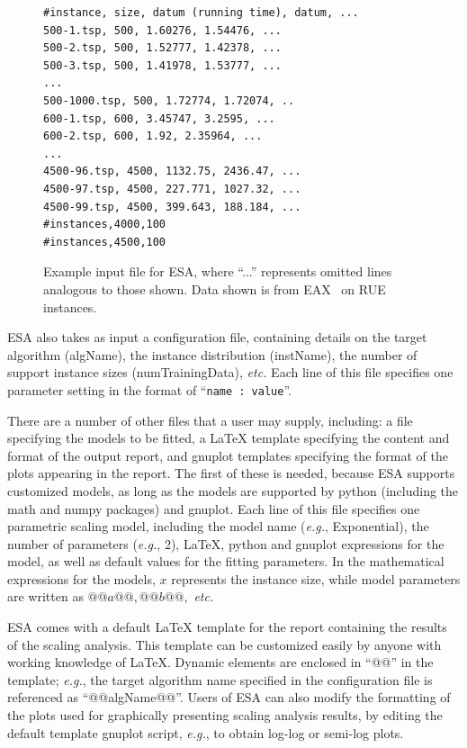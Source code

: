 \documentclass[aic]{iosart2x}
\newcommand{\eg}{\emph{e.g.}}
\begin{document}
\begin{figure}[t]
\begin{lstlisting}[basicstyle={\scriptsize\ttfamily}]
#instance, size, datum (running time), datum, ...
500-1.tsp, 500, 1.60276, 1.54476, ...
500-2.tsp, 500, 1.52777, 1.42378, ...
500-3.tsp, 500, 1.41978, 1.53777, ...
...
500-1000.tsp, 500, 1.72774, 1.72074, ..
600-1.tsp, 600, 3.45747, 3.2595, ...
600-2.tsp, 600, 1.92, 2.35964, ...
...
4500-96.tsp, 4500, 1132.75, 2436.47, ...
4500-97.tsp, 4500, 227.771, 1027.32, ...
4500-99.tsp, 4500, 399.643, 188.184, ...
#instances,4000,100
#instances,4500,100
\end{lstlisting}
\vspace*{-3mm}
\caption{Example input file for ESA, where ``...'' represents omitted lines analogous to those shown. Data shown is from EAX~\cite{NagKob13} on RUE instances.\label{fig:Excerpt-ESA-input}}
\end{figure}

ESA also takes as input a configuration file, containing details on the target algorithm (algName), the instance distribution (instName), the number of support instance sizes (numTrainingData), \emph{etc.}  
Each line of this file specifies one parameter setting in the format of  ``\lstinline[basicstyle={\ttfamily}]!name : value!''.

There are a number of other files that a user may supply, including: a file specifying the models to be fitted, a {\LaTeX} template specifying the content and format of the output report, and gnuplot templates specifying the format of the plots appearing in the report. 
The first of these is needed, because ESA supports customized models, as long as the models are supported by python (including the math and numpy packages) and gnuplot. 
Each line of this file specifies one parametric scaling model,  including the model name (\eg{}, Exponential), the number of parameters (\eg{}, 2), {\LaTeX}, python and gnuplot expressions for the model, as well as default values for the fitting parameters. 
In the mathematical expressions for the models, $x$ represents the instance size, while model parameters are written as $@@a@@, @@b@@,$ \emph{etc.}


ESA comes with a default {\LaTeX} template for the report containing the results of the scaling analysis. This template can be customized easily by anyone with working knowledge of \LaTeX. 
Dynamic elements are enclosed in ``@@'' in the template; \eg{}, the target algorithm name specified in the configuration file is referenced as ``@@algName@@''. 
Users of ESA can also modify the formatting of the plots used for graphically presenting scaling analysis results, by editing the default template gnuplot script, \eg{}, to obtain log-log or semi-log plots.
\end{document}
